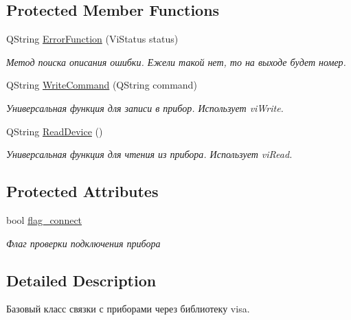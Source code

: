 \subsection*{Protected Member Functions}
\begin{DoxyCompactItemize}
\item 
Q\+String \hyperlink{class_base_device_a94fda8711eb27d0c9abbe470a30a32bf}{Error\+Function} (Vi\+Status status)
\begin{DoxyCompactList}\small\item\em Метод поиска описания ошибки. Ежели такой нет, то на выходе будет номер. \end{DoxyCompactList}\item 
Q\+String \hyperlink{class_base_device_a8e7de3e063defc28d0bd3d850099d4a5}{Write\+Command} (Q\+String command)
\begin{DoxyCompactList}\small\item\em Универсальная функция для записи в прибор. Использует vi\+Write. \end{DoxyCompactList}\item 
Q\+String \hyperlink{class_base_device_ac73856a92b58fd249e41bed55cee55ef}{Read\+Device} ()
\begin{DoxyCompactList}\small\item\em Универсальная функция для чтения из прибора. Использует vi\+Read. \end{DoxyCompactList}\end{DoxyCompactItemize}
\subsection*{Protected Attributes}
\begin{DoxyCompactItemize}
\item 
\hypertarget{class_base_device_a804561b100ae59ba8785ecdb23e14384}{}\label{class_base_device_a804561b100ae59ba8785ecdb23e14384} 
bool \hyperlink{class_base_device_a804561b100ae59ba8785ecdb23e14384}{flag\+\_\+connect}
\begin{DoxyCompactList}\small\item\em Флаг проверки подключения прибора \end{DoxyCompactList}\end{DoxyCompactItemize}


\subsection{Detailed Description}
Базовый класс связки с приборами через библиотеку visa. 

